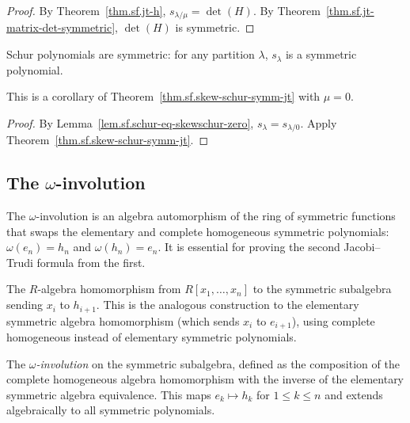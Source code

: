 \begin{proof}
By Theorem~\ref{thm.sf.jt-h}, $s_{\lambda/\mu} = \det(H)$.
By Theorem~\ref{thm.sf.jt-matrix-det-symmetric}, $\det(H)$ is symmetric.
\end{proof}

\begin{theorem}
\label{thm.sf.schur-symm-jt}
\leanhelper
\leanok
Schur polynomials are symmetric: for any partition $\lambda$,
$s_\lambda$ is a symmetric polynomial.

This is a corollary of Theorem~\ref{thm.sf.skew-schur-symm-jt}
with $\mu = 0$.
\end{theorem}

\begin{proof}
By Lemma~\ref{lem.sf.schur-eq-skewschur-zero}, $s_\lambda = s_{\lambda/0}$.
Apply Theorem~\ref{thm.sf.skew-schur-symm-jt}.
\end{proof}

\subsection{The $\omega$-involution}

The $\omega$-involution is an algebra automorphism of the ring of symmetric
functions that swaps the elementary and complete homogeneous symmetric
polynomials: $\omega(e_n) = h_n$ and $\omega(h_n) = e_n$.
It is essential for proving the second Jacobi--Trudi formula from the first.

\begin{definition}
\label{def.sf.hsymm-alg-hom}
\leanhelper
\leanok
The $R$-algebra homomorphism from $R[x_1, \ldots, x_n]$ to the symmetric
subalgebra sending $x_i$ to $h_{i+1}$.
This is the analogous construction to the elementary symmetric algebra homomorphism
(which sends $x_i$ to $e_{i+1}$), using complete homogeneous instead of elementary
symmetric polynomials.
\end{definition}

\begin{definition}
\label{def.sf.omega-involution}
\leanhelper
\leanok
The \emph{$\omega$-involution} on the symmetric subalgebra, defined as
the composition of the complete homogeneous algebra homomorphism with the
inverse of the elementary symmetric algebra equivalence.
This maps $e_k \mapsto h_k$ for $1 \leq k \leq n$ and extends
algebraically to all symmetric polynomials.
\end{definition}

